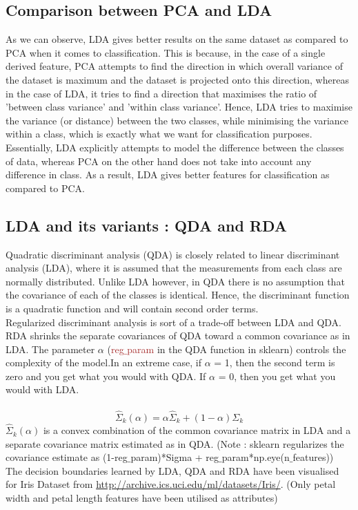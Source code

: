 \documentclass[paper=a4, fontsize=11pt]{scrartcl}
\numberwithin{equation}{section}		%
\numberwithin{figure}{section}			%
\numberwithin{table}{section}				%
\begin{document}
\subsection*{Comparison between PCA and LDA}
As we can observe, LDA gives better results on the same dataset as compared to PCA when it comes to classification. This is because, in the case of a single derived feature, PCA attempts to find the direction in which overall variance of the dataset is maximum and the dataset is projected onto this direction, whereas in the case of LDA, it tries to find a direction that maximises the ratio of 'between class variance' and 'within class variance'. Hence, LDA tries to maximise the variance (or distance) between the two classes, while minimising the variance within a class, which is exactly what we want for classification purposes. Essentially, LDA explicitly attempts to model the difference between the classes of data, whereas PCA on the other hand does not take into account any difference in class. As a result, LDA gives better features for classification as compared to PCA.

\subsection{LDA and its variants : QDA and RDA}
Quadratic discriminant analysis (QDA) is closely related to linear discriminant analysis (LDA), where it is assumed that the measurements from each class are normally distributed. Unlike LDA however, in QDA there is no assumption that the covariance of each of the classes is identical. Hence, the discriminant function is a quadratic function and will contain second order terms.\\
Regularized discriminant analysis is sort of a trade-off between LDA and QDA. RDA shrinks the separate covariances of QDA toward a common covariance as in LDA. The parameter $\alpha$ (\textcolor{Brown}{reg$\_$param} in the QDA function in sklearn) controls the complexity of the model.In an extreme case, if $\alpha$ = 1, then the second term is zero and you get what you would with QDA. If $\alpha$ = 0, then you  get what you would with LDA.\\\\
\begin{equation*}
{\hat\Sigma}_{k}(\alpha) = \alpha{\hat\Sigma}_{k} + (1-\alpha){\Sigma_{k}}
\end{equation*}
${\hat\Sigma}_{k}(\alpha)$ is a convex combination of the common covariance matrix in LDA and a separate covariance matrix estimated as in QDA. (Note : sklearn regularizes the covariance estimate as (1-reg$\_$param)*Sigma + reg$\_$param*np.eye(n$\_$features))\\
The decision boundaries learned by LDA, QDA and RDA have been visualised for Iris Dataset from \textcolor{blue}{\url{http://archive.ics.uci.edu/ml/datasets/Iris/}}. (Only petal width and petal length features have been utilised as attributes) \\
\end{document}
